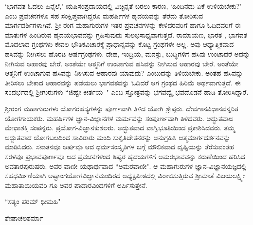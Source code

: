 `ಭಾಗವತ ಓದಲು ಹಿನ್ನೆಲೆ,' ಋಷಿಸಂಪ್ರದಾಯದಲ್ಲಿ ವಿಚ್ಛಿನ್ನತೆ ಬರಲು ಕಾರಣ, `ಹಿಂದಿನದು ಏಕೆ ಉಳಿಯಬೇಕು?' ಎಂಬ ಪ್ರವಚನಗಳೂ ಸಹ ಸಂಕ್ಷಿಪ್ತವಾಗಿದ್ದರೂ ಮಹರ್ಷಿಗಳ ಹೃದಯವನ್ನು ತೆರೆದು ತೋರಿಸುವ ಮಾರ್ಗದರ್ಶಿಗಳಾಗಿವೆ. ಶ್ರೀ ರಂಗ ಮಹಾಗುರುಗಳ ಇತರ ಪ್ರವಚನಗಳನ್ನು ಕೇಳಿದರವರಿಗೆ ಹಾಗೂ ಓದಿದವರಿಗೆ ಈ ಮಾತುಗಳ ಹಿಂದಿರುವ ಹೃದಯಭಾವವನ್ನು ಗ್ರಹಿಸುವುದು ಸುಲಭಸಾಧ್ಯವಾಗುತ್ತದೆ. ರಾಮಾಯಣ, ಭಾರತ , ಭಾಗವತ ಮೊದಲಾದ ಗ್ರಂಥಗಳು ಕೇವಲ ಭೌತಿಕವಿಚಾರಕ್ಕೆ ಪ್ರಾಧಾನ್ಯವನ್ನು  ಕೊಟ್ಟ ಗ್ರಂಥಗಳೇ ಅಲ್ಲ. ಅವು ಆಧ್ಯಾತ್ಮಿಕವಾದ ಹಸಿವನ್ನು ನೀಗಿಸಲು ಹೊರಟ ಆರ್ಷಗ್ರಂಥಗಳು. ದೇಹ, ಇಂದ್ರಿಯ, ಮನಸ್ಸು, ಬುದ್ಧಿಗಳಿಗೆ ಹಸಿವು ಉಂಟಾದರೆ ಅದನ್ನು  ನೀಗಿಸುವ ಆಹಾರವು ಬೇರೆ. ಅಂತೆಯೇ ಆತ್ಮನಿಗೆ ಉಂಟಾಗುವ ಹಸಿವನ್ನು ನೀಗಿಸುವ ಆಹಾರವು ಬೇರೆ. ಅಂತೆಯೇ ಆತ್ಮನಿಗೆ ಉಂಟಾಗುವ ಹಸಿವನ್ನು ನೀಗಿಸುವ ಆಹಾರವು ಯಾವುದು? ಎಂಬುದನ್ನು ತಿಳಿಯಬೇಕು. ಅಂತಹ ಹಸಿವನ್ನು ತೀರಿಸಲು ಬೇಕಾದ ಆಹಾರವನ್ನು ಪಡೆಯಲು ಭಾಗವತವನ್ನು ಓದಿದರೆ ಆಗ ಗ್ರಂಥದ ಹಿರಿಮೆ ಅರ್ಥವಾಗುತ್ತದೆ. ಈ ಸಂದರ್ಭದಲ್ಲಿ ಶ್ರೀಗುರುಗಳು ``ಜಿಹ್ವೇ ಕೀರ್ತಯ--" ಎಂಬ ಸ್ತೋತ್ರವನ್ನು ಭಗವದ್ವೈ ಭವದೊಡನೆ ಹಾಡಿ ತೋರಿಸಿದ್ದಾರೆ.

ಶ್ರೀರಂಗ ಮಹಾಗುರುಗಳು ಯೋಗರಹಸ್ಯಗಳನ್ನು ಪೂರ್ಣವಾಗಿ ತಿಳಿದ ಯೋಗಿ ಶ್ರೇಷ್ಠರು. ದೇವಗಾನವಿಧಾನವನ್ನರಿತ ಯೋಗಗಾಯಕರು. ಮಹರ್ಷಿಗಳ ಜ್ಞಾನ-ವಿಜ್ಞಾನಗಳ ಮರ್ಮವನ್ನು ಸಂಪೂರ್ಣವಾಗಿ ತಿಳಿದವರು. ಅದ್ಭುತವಾಅ ಮೇಧಾಶಕ್ತಿ ಸಂಪನ್ನರು. ಪ್ರಯೋಗ-ವಿಜ್ಞಾನಕುಶಲರು. ಅದ್ಭುತವಾದ ವಾಗ್ವಿಭೂತಿಯಿಂದ ಪ್ರಕಾಶಿಸಿದವರು. ತಮ್ಮ ಅದ್ಬುತವಾದ ಯೋಗಬಲದಿಂದ ಸಾವಿರಾರು ಮಂದಿ ಸುಕೃತಿಚೇತನರನ್ನು ಅನುಗ್ರಹಿಸಿ ಆತ್ಮಮಾರ್ಗದರ್ಶನವನ್ನು ಮಾಡಿಸಿದರು. ಸನಾತನವೂ ಆರ್ಷವೂ ಆದ ಧರ್ಮಸಂಸ್ಕೃತಿಗಳ ಬಗ್ಗೆ ಮೌಲಿಕವಾದ ದೃಷ್ಟಿಯನ್ನು ತೆರೆಸುವಂತಹ ಸರಳವೂ ಪ್ರಭಾವಪೂರ್ಣವೂ ಆದ ಪ್ರವಚನಗಳಿಂದ ಶಿಷ್ಯರ ಹೃದಯಗಳಿಗೆ ಅಮರಭಾವವನ್ನು ಕರುಣೆಯಿಂದ ಹರಿಸಿದ ಅವತಾರಪುರುಷರು. ಅವರ ವಾಣೀ ಯಥಾರ್ಥವಾದ ``ಅಮರವಾಣೀ". ಆ ಮಹಾಗುರುಗಳ ಜ್ಞಾನ-ವಿಜ್ಞಾನಯಜ್ಞದಲ್ಲಿ ಸಹಧರ್ಮಿಣಿಯಾಗಿ ಅಷ್ಟಾಂಗಯೋಗವಿಜ್ಞಾನಮಂದಿರದ ಅಧ್ಯಕ್ಷಪೀಠದಲ್ಲಿ ವಿರಾಜಿಸುತ್ತಿರುವ ಶ್ರೀಮಾತೆ ವಿಜಯಲಕ್ಷ್ಮೀ ಮಹಾತಾಯಿಯವರಿ ಗೂ ಅವರ ಪಾದಾರವಿಂದಗಳಿಗೆ ಅರ್ಪಿಸುತ್ತೇನೆ. 

                             ``ಸತ್ಯಂ ಪರಮ್ ಧೀಮಹಿ"
 
\hfill{ಶೇಷಾಚಲಶರ್ಮಾ}                             
